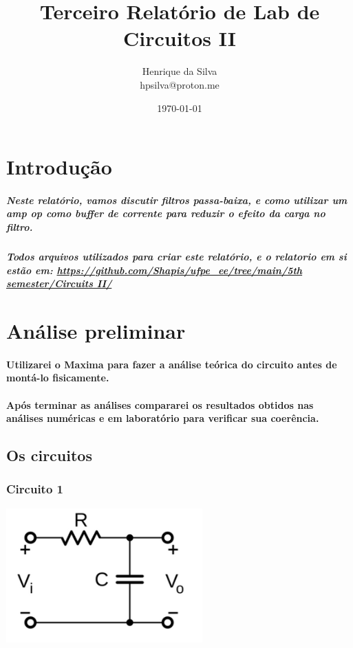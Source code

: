 \documentclass[12pt,twoside, a4paper, twocolumn]{article}
\title{Terceiro Relatório de Lab de Circuitos II}
\author{Henrique da Silva \\ hpsilva@proton.me}
\date{\today}
\begin{document}
\maketitle
{}
\newpage
\tableofcontents
\newpage


\section{Introdução}


\subparagraph*{Neste relatório, vamos discutir filtros passa-baixa, e como utilizar um amp op como buffer de corrente para reduzir o efeito da carga no filtro.}


\subparagraph*{Todos arquivos utilizados para criar este relatório, e o relatorio em si estão em:  \url{https://github.com/Shapis/ufpe_ee/tree/main/5th semester/Circuits II/}}




\section{Análise preliminar}


\paragraph*{Utilizarei o Maxima para fazer a análise teórica do circuito antes de montá-lo fisicamente.}


\paragraph*{Após terminar as análises compararei os resultados obtidos nas análises numéricas e em laboratório para verificar sua coerência.}


\subsection{Os circuitos}


\subsubsection{Circuito 1}
\begin{adjustbox}{scale=0.6}
    \includegraphics{circuito1.png}
\end{adjustbox}
\end{document}
